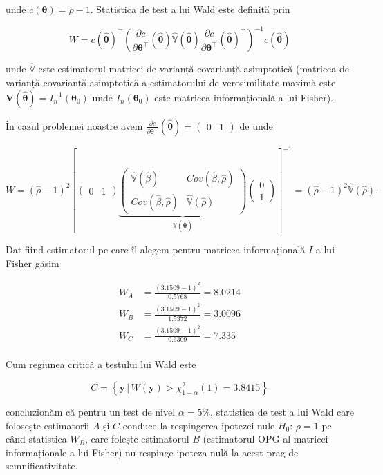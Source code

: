 \documentclass[]{article}
\renewcommand\refname{Referințe}
\begin{document}
unde \(c(\boldsymbol{\theta}) = \rho - 1\). Statistica de test a lui
Wald este definită prin

\[
W = c(\hat{\boldsymbol{\theta}})^\intercal\left(\frac{\partial c}{\partial \boldsymbol{\theta}^\intercal}(\hat{\boldsymbol{\theta}}) \hat{\mathbb{V}}(\hat{\boldsymbol{\theta}})\frac{\partial c}{\partial \boldsymbol{\theta}^\intercal}(\hat{\boldsymbol{\theta}})^\intercal\right)^{-1}c(\hat{\boldsymbol{\theta}})
\]

unde \(\hat{\mathbb{V}}\) este estimatorul matricei de
varianță-covarianță asimptotică (matricea de varianță-covarianță
asimptotică a estimatorului de verosimilitate maximă este
\(\mathbf{V}(\hat{\boldsymbol{\theta}}) = I_n^{-1}(\boldsymbol{\theta}_0)\)
unde \(I_n(\boldsymbol{\theta}_0)\) este matricea informațională a lui
Fisher).

În cazul problemei noastre avem
\(\frac{\partial c}{\partial \boldsymbol{\theta}^\intercal}(\hat{\boldsymbol{\theta}}) = \begin{pmatrix}0 & 1\end{pmatrix}\)
de unde

\[
W = (\hat{\rho} - 1)^2\left[\begin{pmatrix}0 & 1\end{pmatrix} \underbrace{\begin{pmatrix}\hat{\mathbb{V}}(\hat{\beta}) & Cov(\hat{\beta}, \hat{\rho})  \\ Cov(\hat{\beta}, \hat{\rho}) &  \hat{\mathbb{V}}(\hat{\rho})\end{pmatrix}}_{\hat{\mathbb{V}}(\hat{\boldsymbol{\theta}})}\begin{pmatrix}0 \\ 1\end{pmatrix}\right]^{-1} = (\hat{\rho} - 1)^2\hat{\mathbb{V}}(\hat{\rho}).
\]

Dat fiind estimatorul pe care îl alegem pentru matricea informațională
\(I\) a lui Fisher găsim

\begin{align*}
W_{A} & = \frac{(3.1509 - 1)^2}{0.5768} = 8.0214\\
W_{B} & = \frac{(3.1509 - 1)^2}{1.5372} = 3.0096\\
W_{C} & = \frac{(3.1509 - 1)^2}{0.6309} = 7.335\\
\end{align*}

Cum regiunea critică a testului lui Wald este

\[
  C = \left\{\mathbf{y} \,|\, W(\mathbf{y}) > \chi^2_{1-\alpha}(1) = 3.8415\right\}
\]

concluzionăm că pentru un test de nivel \(\alpha = 5\%\), statistica de
test a lui Wald care folosește estimatorii \(A\) și \(C\) conduce la
respingerea ipotezei nule \(H_0:\,\rho = 1\) pe când statistica \(W_B\),
care folește estimatorul \(B\) (estimatorul OPG al matricei
informaționale a lui Fisher) nu respinge ipoteza nulă la acest prag de
semnificativitate.

\renewcommand\refname{Referințe}

\end{document}
